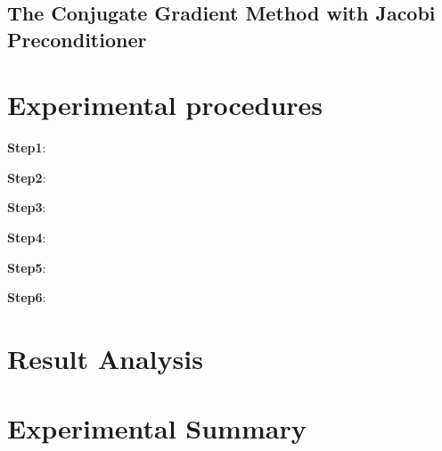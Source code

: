 \documentclass{ExpReport}
\begin{document}
    

\subsection{The Conjugate Gradient Method with Jacobi Preconditioner}



\section{Experimental procedures}


\textbf{Step1}: 


\textbf{Step2}: 


\textbf{Step3}: 


\textbf{Step4}: 


\textbf{Step5}: 


\textbf{Step6}: 


\section{Result Analysis}


\section{Experimental Summary}
\end{document}
